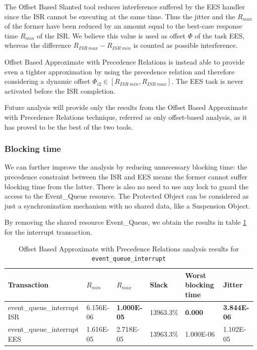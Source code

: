 \documentclass{article}
\begin{document}
The Offset Based Slanted tool reduces interference suffered by the EES handler since the ISR cannot be executing at the same time. Thus the jitter and the $R_{max}$ of the former have been reduced by an amount equal to the best-case response time $R_{min}$ of the ISR. We believe this value is used as offset $\Phi$ of the task EES, whereas the difference $R_{ISR\ max} - R_{ISR\ min}$ is counted as possible interference.

Offset Based Approximate with Precedence Relations is instead able to provide even a tighter approximation by using the precedence relation and therefore considering a dynamic offset $\Phi_{i2} \in [R_{ISR\ min}, R_{ISR\ max}]$. The EES task is never activated before the ISR completion.

Future analysis will provide only the results from the Offset Based Approximate with Precedence Relations technique, referred as only offset-based analysis, as it has proved to be the best of the two tools.

\subsubsection{Blocking time}

We can further improve the analysis by reducing unnecessary blocking time: the precedence constraint between the ISR and EES means the former cannot suffer blocking time from the latter. There is also no need to use any lock to guard the access to the Event\_Queue resource. The Protected Object can be considered as just a synchronization mechanism with no shared data, like a Suspension Object.

By removing the shared resource Event\_Queue, we obtain the results in table \ref{tab:off-approx-w-pr-blocking-time} for the interrupt transaction.

\begin{table}[!htbp]
  \centering
  \begin{tabular}{llllll}
    \toprule
    Transaction & $R_{min}$ & $R_{max}$ & Slack & Worst blocking time & Jitter \\
    \midrule
    event\_queue\_interrupt ISR & 6.156E-06 & \textbf{1.000E-05} & 13963.3\% & \textbf{0.000} & \textbf{3.844E-06} \\
    event\_queue\_interrupt EES & 1.616E-05 & 2.718E-05 & 13963.3\% & 1.000E-06 & 1.102E-05 \\
    \bottomrule
  \end{tabular}
  \caption{Offset Based Approximate with Precedence Relations analysis results for \texttt{event\_queue\_interrupt} }
  \label{tab:off-approx-w-pr-blocking-time}
\end{table}
\end{document}
